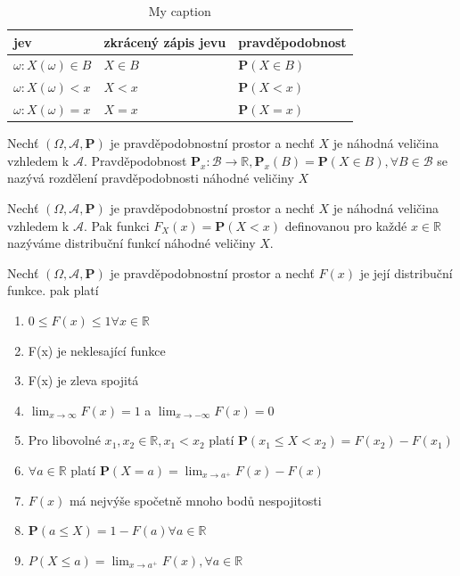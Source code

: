 \begin{table}[h]
\centering
\caption{My caption}
\label{my-label}
\begin{tabular}{lll}
jev &zkrácený zápis jevu  & pravděpodobnost  \\
\hline
$\omega:X(\omega)\in B$ &$X\in B$  &$\textbf{P}(X\in B)$  \\
$\omega:X(\omega)< x$ &$X < x$  &$\textbf{P}(X<x)$  \\
$\omega:X(\omega)=x $ &$X=x$  &$\textbf{P}(X=x)$  
\end{tabular}
\end{table}



\begin{definition}
Nechť $(\Omega,\mathcal{A},\textbf{P})$ je pravděpodobnostní prostor a nechť $X$ je náhodná veličina vzhledem k $\mathcal{A}$. Pravděpodobnost $\textbf{P}_x:\mathcal{B}\rightarrow \mathbb{R}, \textbf{P}_x(B)=\textbf{P}(X\in B), \forall B\in \mathcal{B}$ se nazývá rozdělení pravděpodobnosti náhodné veličiny $X$
\end{definition}



\begin{definition}
Nechť $(\Omega,\mathcal{A},\textbf{P})$ je pravděpodobnostní prostor a nechť $X$ je náhodná veličina vzhledem k $\mathcal{A}$. Pak funkci $F_X(x)=\textbf{P}(X<x)$ definovanou pro každé $x\in \mathbb{R}  $ nazýváme distribuční funkcí náhodné veličiny $X$.
\end{definition}

\begin{theorem}
Nechť $(\Omega,\mathcal{A},\textbf{P})$ je pravděpodobnostní prostor a nechť $F(x)$ je její distribuční funkce. pak platí
\begin{enumerate}
\item $0\leq F(x)\leq 1\forall x \in \mathbb{R}$
\item F(x) je neklesající funkce
\item F(x) je zleva spojitá
\item $\lim_{x\rightarrow \infty}F(x)=1$ a  $\lim_{x\rightarrow -\infty}F(x)=0$
\item Pro libovolné $x_1,x_2 \in \mathbb{R}, x_1<x_2$ platí $\textbf{P}(x_1\leq X<x_2)=F(x_2)-F(x_1)$
\item $\forall a \in \mathbb{R}$ platí $\textbf{P}(X=a)=\lim_{x\rightarrow a^+} F(x)-F(x)$
\item $F(x)$ má nejvýše spočetně mnoho bodů nespojitosti
\item $\textbf{P}(a\leq X)=1-F(a) \forall a \in \mathbb{R}$
\item $P(X\leq a) = \lim_{x\rightarrow a^+} F(x) , \forall a \in \mathbb{R}$
\end{enumerate}
\end{theorem}

